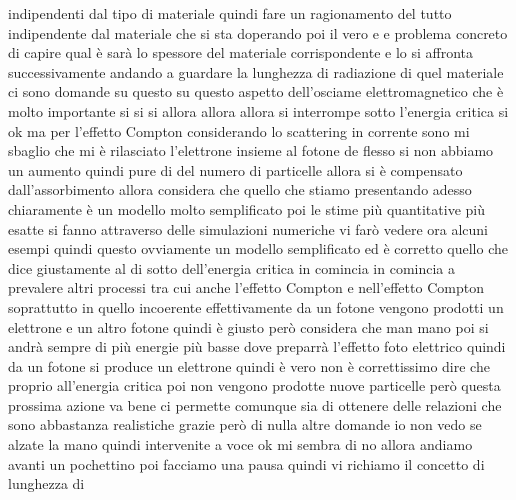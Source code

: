{indipendenti dal tipo di materiale quindi fare un ragionamento del tutto indipendente dal materiale che si sta doperando poi il vero e e problema concreto di capire qual è sarà lo spessore del materiale corrispondente e lo si affronta successivamente andando a guardare la lunghezza di radiazione di quel materiale ci sono domande su questo su questo aspetto dell'osciame elettromagnetico che è molto importante si si si allora allora allora si interrompe sotto l'energia critica si ok ma per l'effetto Compton considerando lo scattering in corrente sono mi sbaglio che mi è rilasciato l'elettrone insieme al fotone de flesso si non abbiamo un aumento quindi pure di del numero di particelle allora si è compensato dall'assorbimento allora considera che quello che stiamo presentando adesso chiaramente è un modello molto semplificato poi le stime più quantitative più esatte si fanno attraverso delle simulazioni numeriche vi farò vedere ora alcuni esempi quindi questo ovviamente un modello semplificato ed è corretto quello che dice giustamente al di sotto dell'energia critica in comincia in comincia a prevalere altri processi tra cui anche l'effetto Compton e nell'effetto Compton soprattutto in quello incoerente effettivamente da un fotone vengono prodotti un elettrone e un altro fotone quindi è giusto però considera che man mano poi si andrà sempre di più energie più basse dove preparrà l'effetto foto elettrico quindi da un fotone si produce un elettrone quindi è vero non è correttissimo dire che proprio all'energia critica poi non vengono prodotte nuove particelle però questa prossima azione va bene ci permette comunque sia di ottenere delle relazioni che sono abbastanza realistiche grazie però di nulla altre domande io non vedo se alzate la mano quindi intervenite a voce ok mi sembra di no allora andiamo avanti un pochettino poi facciamo una pausa quindi vi richiamo il concetto di lunghezza di 

}

